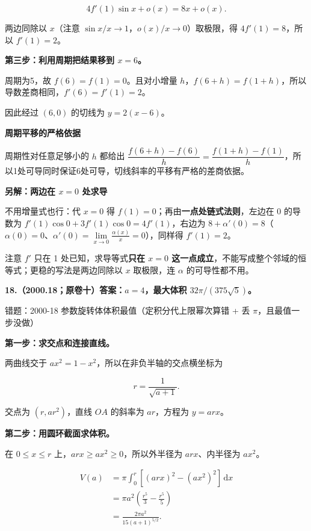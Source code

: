 \documentclass[UTF8,11pt,fontset=windows]{ctexart}
\begin{document}
$$
4f'(1)\sin x+o(x)=8x+o(x).
$$

两边同除以 $x$（注意 $\sin x/x\to1$，$o(x)/x\to0$）取极限，得 $4f'(1)=8$，所以 $f'(1)=2$。

\textbf{第三步：利用周期把结果移到 $x=6$。}

周期为5，故 $f(6)=f(1)=0$。且对小增量 $h$，$f(6+h)=f(1+h)$，所以导数差商相同，$f'(6)=f'(1)=2$。

因此经过 $(6,0)$ 的切线为 $y=2(x-6)$。

{\bfseries 周期平移的严格依据\par}
周期性对任意足够小的 $h$ 都给出 $\dfrac{f(6+h)-f(6)}h=\dfrac{f(1+h)-f(1)}h$，所以1处可导同时保证6处可导，切线斜率的平移有严格的差商依据。

{\bfseries 另解：两边在 $x=0$ 处求导\par}
不用增量式也行：代 $x=0$ 得 $f(1)=0$；再由\textbf{一点处链式法则}，左边在 $0$ 的导数为 $f'(1)\cos0+3f'(1)\cos0=4f'(1)$，右边为 $8+\alpha'(0)=8$（$\alpha(0)=0$、$\alpha'(0)=\lim\limits_{x\to0}\frac{\alpha(x)}x=0$），同样得 $f'(1)=2$。

注意 $f'$ 只在 1 处已知，求导等式\textbf{只在 $x=0$ 这一点成立}，不能写成整个邻域的恒等式；更稳的写法是两边同除以 $x$ 取极限，连 $\alpha$ 的可导性都不用。

\clearpage

\textbf{18.（2000.18；原卷十）答案：$a=4$，最大体积 $32\pi/(375\sqrt5)$。}

\begingroup\color{gray}错题：2000-18 参数旋转体体积最值（定积分代上限幂次算错 + 丢 $\pi$，且最值一步没做）\par\endgroup

\textbf{第一步：求交点和连接直线。}

两曲线交于 $ax^2=1-x^2$，所以在非负半轴的交点横坐标为

$$
r=\frac1{\sqrt{a+1}}.
$$

交点为 $(r,ar^2)$，直线 $OA$ 的斜率为 $ar$，方程为 $y=arx$。

\textbf{第二步：用圆环截面求体积。}

在 $0\le x\le r$ 上，$arx\ge ax^2\ge0$，所以外半径为 $arx$、内半径为 $ax^2$。

$$
\begin{aligned}
V(a)&=\pi\int_0^r[(arx)^2-(ax^2)^2]\,\mathrm dx\\
&=\pi a^2\left(\frac{r^5}{3}-\frac{r^5}{5}\right)\\
&=\frac{2\pi a^2}{15(a+1)^{5/2}}.
\end{aligned}
$$
\end{document}
